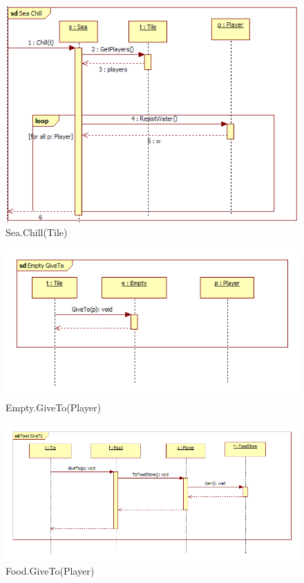 \begin{figure}[H]
	\begin{center}
		\includegraphics[width=13cm]{chapters/chapter03/seqdiag/Sea_Chill.png}
		\caption{Sea.Chill(Tile)}
		\label{fig:SeaChill}
	\end{center}
\end{figure}
\begin{figure}[H]
	\begin{center}
		\includegraphics[width=13cm]{chapters/chapter03/seqdiag/Empty_GiveTo.png}
		\caption{Empty.GiveTo(Player)}
		\label{fig:EmptyGiveTo}
	\end{center}
\end{figure}
\begin{figure}[H]
	\begin{center}
		\includegraphics[width=15cm]{chapters/chapter03/seqdiag/Food_GiveTo.png}
		\caption{Food.GiveTo(Player)}
		\label{fig:FoodGiveTo}
	\end{center}
\end{figure}
